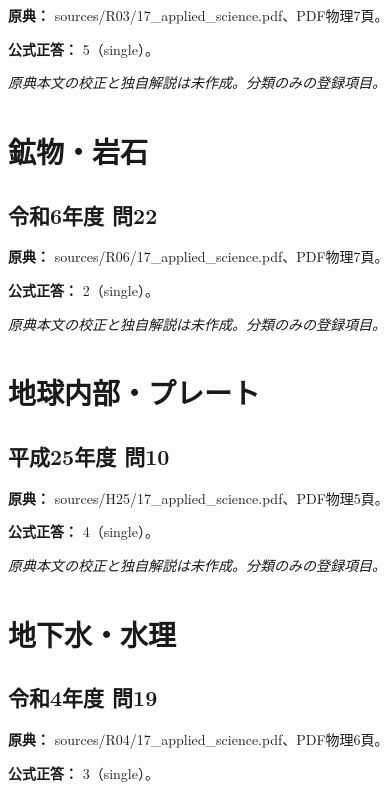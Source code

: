 \noindent\textbf{原典：} sources/R03/17\_applied\_science.pdf、PDF物理7頁。

\textbf{公式正答：} 5（single）。

\par\textit{原典本文の校正と独自解説は未作成。分類のみの登録項目。}

\section{鉱物・岩石}

\subsection{令和6年度 問22}
\label{q:r06-reg-applied-22}

\noindent\textbf{原典：} sources/R06/17\_applied\_science.pdf、PDF物理7頁。

\textbf{公式正答：} 2（single）。

\par\textit{原典本文の校正と独自解説は未作成。分類のみの登録項目。}

\section{地球内部・プレート}

\subsection{平成25年度 問10}
\label{q:h25-reg-applied-10}

\noindent\textbf{原典：} sources/H25/17\_applied\_science.pdf、PDF物理5頁。

\textbf{公式正答：} 4（single）。

\par\textit{原典本文の校正と独自解説は未作成。分類のみの登録項目。}

\section{地下水・水理}

\subsection{令和4年度 問19}
\label{q:r04-reg-applied-19}

\noindent\textbf{原典：} sources/R04/17\_applied\_science.pdf、PDF物理6頁。

\textbf{公式正答：} 3（single）。

